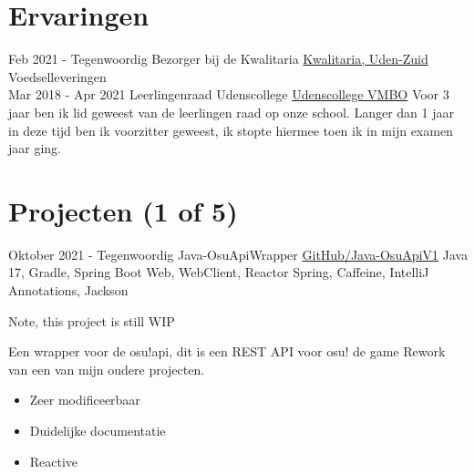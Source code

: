 \documentclass[letterpaper]{twentysecondcv} %
\begin{document}
    \vspace{6mm}




    \section{Ervaringen}
    \begin{twenty} %
        \twentyitem
        {Feb 2021 -}
        {Tegenwoordig}
        {Bezorger bij de Kwalitaria}
        {\href{https://kwalitaria.nl/uden-zuid/uden-zuid/}{Kwalitaria, Uden-Zuid}}
        {}
        {Voedselleveringen}\\
        \twentyitem
        {Mar 2018 -}
        {Apr 2021}
        {Leerlingenraad Udenscollege}
        {\href{https://www.udenscollege.nl/vmbo/startpagina-vmbo/}{Udenscollege VMBO}}
        {}
        {
            Voor 3 jaar ben ik lid geweest van de leerlingen raad op onze school.
            Langer dan 1 jaar in deze tijd ben ik voorzitter geweest, ik stopte hiermee toen ik in mijn examen jaar ging.
        }
    \end{twenty}

    \vspace{6mm}




    \section{Projecten (1 of 5)}
    \begin{twenty} %
        \twentyitem
        {Oktober 2021 -}
        {Tegenwoordig}
        {Java-OsuApiWrapper}
        {\href{https://github.com/Tais993/Java-OsuApiV1/}{GitHub/Java-OsuApiV1}}
        {Java 17, Gradle, Spring Boot Web, WebClient, Reactor Spring, Caffeine, IntelliJ Annotations, Jackson}
        {
		Note, this project is still WIP

        Een wrapper voor de osu!api, dit is een REST API voor osu! de game
        Rework van een van mijn oudere projecten.
			\begin{itemize}
				\item Zeer modificeerbaar
				\item Duidelijke documentatie
				\item Reactive
            \end{itemize}}\\

    \end{twenty}
\end{document}
